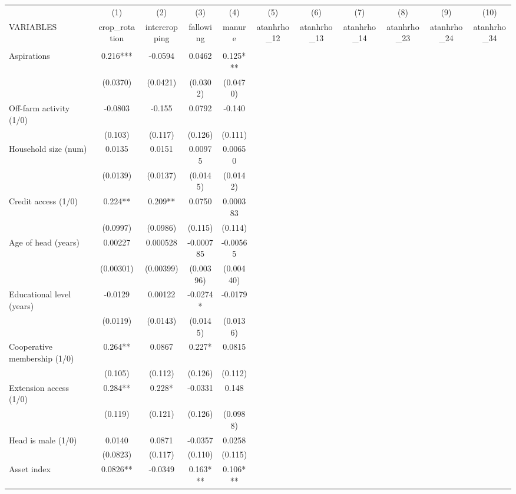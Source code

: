 \documentclass[]{article}
\begin{document}
\begin{tabular}{lcccccccccc} \hline
 & (1) & (2) & (3) & (4) & (5) & (6) & (7) & (8) & (9) & (10) \\
VARIABLES & crop\_rotation & intercropping & fallowing & manure & atanhrho\_12 & atanhrho\_13 & atanhrho\_14 & atanhrho\_23 & atanhrho\_24 & atanhrho\_34 \\ \hline
 &  &  &  &  &  &  &  &  &  &  \\
Aspirations & 0.216*** & -0.0594 & 0.0462 & 0.125*** &  &  &  &  &  &  \\
 & (0.0370) & (0.0421) & (0.0302) & (0.0470) &  &  &  &  &  &  \\
Off-farm activity (1/0) & -0.0803 & -0.155 & 0.0792 & -0.140 &  &  &  &  &  &  \\
 & (0.103) & (0.117) & (0.126) & (0.111) &  &  &  &  &  &  \\
Household size (num) & 0.0135 & 0.0151 & 0.00975 & 0.00650 &  &  &  &  &  &  \\
 & (0.0139) & (0.0137) & (0.0145) & (0.0142) &  &  &  &  &  &  \\
Credit access (1/0) & 0.224** & 0.209** & 0.0750 & 0.000383 &  &  &  &  &  &  \\
 & (0.0997) & (0.0986) & (0.115) & (0.114) &  &  &  &  &  &  \\
Age of head (years) & 0.00227 & 0.000528 & -0.000785 & -0.00565 &  &  &  &  &  &  \\
 & (0.00301) & (0.00399) & (0.00396) & (0.00440) &  &  &  &  &  &  \\
Educational level (years) & -0.0129 & 0.00122 & -0.0274* & -0.0179 &  &  &  &  &  &  \\
 & (0.0119) & (0.0143) & (0.0145) & (0.0136) &  &  &  &  &  &  \\
Cooperative membership (1/0) & 0.264** & 0.0867 & 0.227* & 0.0815 &  &  &  &  &  &  \\
 & (0.105) & (0.112) & (0.126) & (0.112) &  &  &  &  &  &  \\
Extension access (1/0) & 0.284** & 0.228* & -0.0331 & 0.148 &  &  &  &  &  &  \\
 & (0.119) & (0.121) & (0.126) & (0.0988) &  &  &  &  &  &  \\
Head is male (1/0) & 0.0140 & 0.0871 & -0.0357 & 0.0258 &  &  &  &  &  &  \\
 & (0.0823) & (0.117) & (0.110) & (0.115) &  &  &  &  &  &  \\
Asset index & 0.0826** & -0.0349 & 0.163*** & 0.106*** &  &  &  &  &  &  \\

\end{tabular}
\end{document}
